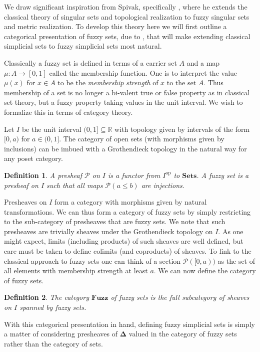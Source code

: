 \documentclass[12pt]{article}
\newtheorem{defn}{Definition}
\begin{document}
We draw significant inspiration from Spivak, specifically \cite{spivakmetric}, where he extends the classical theory of singular sets and topological realization to fuzzy singular sets and metric realization. To develop this theory here we will first outline a categorical presentation of fuzzy sets, due to \cite{barr1986fuzzy}, that will make extending classical simplicial sets to fuzzy simplicial sets most natural. 

Classically a fuzzy set \cite{zadeh1965information} is defined in terms of a carrier set $A$ and a map $\mu:A\to [0,1]$ called the membership function. One is to interpret the value $\mu(x)$ for $x\in A$ to be the \emph{membership strength} of $x$ to the set $A$. Thus membership of a set is no longer a bi-valent true or false property as in classical set theory, but a fuzzy property taking values in the unit interval. We wish to formalize this in terms of category theory.

Let $I$ be the unit interval $(0,1] \subseteq \mathbb{R}$ with topology given by intervals of the form $[0,a)$ for $a\in (0, 1]$. The category of open sets (with morphisms given by inclusions) can be imbued with a Grothendieck topology in the natural way for any poset category.

\begin{defn}
A presheaf $\mathscr{P}$ on $I$ is a functor from $I^\text{op}$ to $\mathbf{Sets}$. A \emph{fuzzy set} is a presheaf on $I$ such that all maps $\mathscr{P}(a\leq b)$ are injections.
\end{defn}

Presheaves on $I$ form a category with morphisms given by natural transformations. We can thus form a category of fuzzy sets by simply restricting to the sub-category of presheaves that are fuzzy sets. We note that such presheaves are trivially sheaves under the Grothendieck topology on $I$. As one might expect, limits (including products) of such sheaves are well defined, but care must be taken to define colimits (and coproducts) of sheaves. To link to the classical approach to fuzzy sets one can think of a section $\mathscr{P}([0,a))$ as the set of all elements with membership strength at least $a$. We can now define the category of fuzzy sets.

\begin{defn}
The category $\mathbf{Fuzz}$ of \emph{fuzzy sets} is the full subcategory of sheaves on $I$ spanned by fuzzy sets.
\end{defn}

With this categorical presentation in hand, defining fuzzy simplicial sets is simply a matter of considering presheaves of $\boldsymbol\Delta$ valued in the category of fuzzy sets rather than the category of sets.
\end{document}
